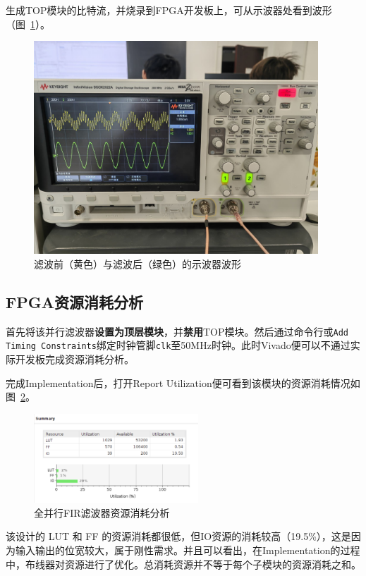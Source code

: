 生成TOP模块的比特流，并烧录到FPGA开发板上，可从示波器处看到波形（图~\ref{fig:exp5:Implementation}）。
\begin{figure}[htbp]
  \centering
  \includegraphics[width = 0.95\textwidth]{figure/exp5/waveform.jpg}
  \caption{滤波前（黄色）与滤波后（绿色）的示波器波形}
  \label{fig:exp5:Implementation}
\end{figure}
\subsection{FPGA资源消耗分析}
首先将该并行滤波器\textbf{设置为顶层模块}，并\textbf{禁用}TOP模块。然后通过命令行或\texttt{Add Timing Constraints}绑定时钟管脚\texttt{clk}至50MHz时钟。此时Vivado便可以不通过实际开发板完成资源消耗分析。

完成Implementation后，打开Report Utilization便可看到该模块的资源消耗情况如图~\ref{fig:parrllel:util}。
\begin{figure}[htbp]
  \centering
  \includegraphics[width=0.55\textwidth]{figure/exp5/util_summary.png}
  \caption{全并行FIR滤波器资源消耗分析}
  \label{fig:parrllel:util}
\end{figure}

该设计的 LUT 和 FF 的资源消耗都很低，但IO资源的消耗较高（19.5\%），这是因为输入输出的位宽较大，属于刚性需求。并且可以看出，在Implementation的过程中，布线器对资源进行了优化。总消耗资源并不等于每个子模块的资源消耗之和。

